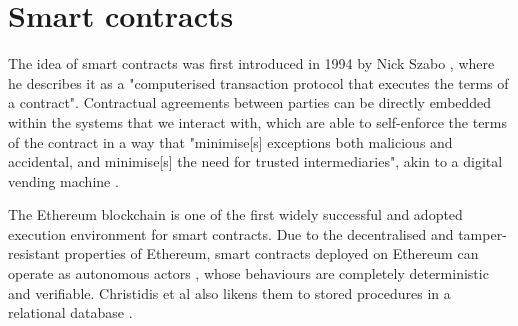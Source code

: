 \section{Smart contracts}

The idea of smart contracts was first introduced in 1994 by Nick Szabo \cite{nickszabosmartcontracts1},
where he describes it as a "computerised transaction protocol that executes the terms of a contract". 
Contractual agreements between parties can be directly embedded within the systems that we 
interact with, which are able to self-enforce the terms of the contract
in a way that "minimise[s] exceptions both malicious and accidental, and minimise[s] the need
for trusted intermediaries", akin to a digital vending machine \cite{nickszabosmartcontracts2}.

The Ethereum blockchain is one of the first widely successful and adopted execution environment for 
smart contracts. Due to the decentralised and tamper-resistant properties of Ethereum, 
smart contracts deployed on Ethereum can operate as autonomous actors \cite{smartcontractsforiot},
whose behaviours are completely deterministic and verifiable. Christidis et al also likens them to 
stored procedures in a relational database \cite{smartcontractsforiot}. 


